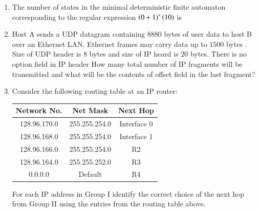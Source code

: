 \documentclass[journal,12pt,onecolumn]{IEEEtran}
\theoremstyle{remark}
\begin{document}
\begin{enumerate}
		\item The number of states in the minimal deterministic finite automaton corresponding to the regular expression $\left(0 + 1\right)^* \left(10\right)$ is \underline{\hspace{2cm}}
		
		\hfill{}
		
		\item Host A sends a UDP datagram containing $8880$ bytes of user data to host B over an Ethernet LAN. Ethernet frames may carry data up to $1500$ bytes . Size of UDP header is $8$ bytes and size of IP heard is $20$ bytes. There is no option field in IP header How many total number of IP fragments will be transmitted and what will be the contents of offset field in the last fragment?
		
		\hfill{}
		
		\begin{enumerate}
		\end{enumerate}
		
		\item Consider the following routing table at an IP router:
		
		\begin{table}[h]
			\centering
			\begin{tabular}{|c|c|c|}
				\hline
				Network No. & Net Mask & Next Hop \\
				\hline
				128.96.170.0 & 255.255.254.0 & Interface 0 \\
								\hline				
				128.96.168.0 & 255.255.254.0 & Interface 1 \\
								\hline
				128.96.166.0 & 255.255.254.0 & R2 \\
								\hline
				128.96.164.0 & 255.255.252.0 & R3 \\
								\hline
				0.0.0.0 & Default & R4 \\
				\hline
			\end{tabular}
		\end{table}
		
		For each IP address in Group I identify the correct choice of the next hop from Group II using the entries from the routing table above.
		

\end{enumerate}
\end{document}
